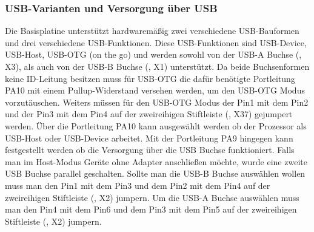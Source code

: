 \subsubsection{USB-Varianten und Versorgung über USB}
Die \gls{Basisplatine} unterstützt hardwaremäßig zwei verschiedene USB-Bauformen und drei verschiedene USB-Funktionen. Diese USB-Funktionen sind USB-Device, USB-Host, USB-OTG (on the go) und werden sowohl von der USB-A Buchse (, X3), als auch von der USB-B Buchse (, X1) unterstützt. Da beide Buchsenformen keine ID-Leitung besitzen muss für USB-OTG die dafür benötigte Portleitung PA10 mit einem Pullup-Widerstand versehen werden, um den USB-OTG Modus vorzutäuschen. Weiters müssen für den USB-OTG Modus der Pin1 mit dem Pin2 und der Pin3 mit dem Pin4 auf der zweireihigen Stiftleiste (, X37) gejumpert werden. Über die Portleitung PA10 kann ausgewählt werden ob der Prozessor als USB-Host oder USB-Device arbeitet. Mit der Portleitung PA9 hingegen kann festgestellt werden ob die Versorgung über die USB Buchse funktioniert. Falls man im Host-Modus Geräte ohne Adapter anschließen möchte, wurde eine zweite USB Buchse parallel geschalten.  Sollte man die USB-B Buchse auswählen wollen muss man den Pin1 mit dem Pin3 und dem Pin2 mit dem Pin4 auf der zweireihigen Stiftleiste (, X2) jumpern. Um die USB-A Buchse auswählen muss man den Pin4 mit dem Pin6 und dem Pin3 mit dem Pin5 auf der zweireihigen Stiftleiste (, X2) jumpern.

